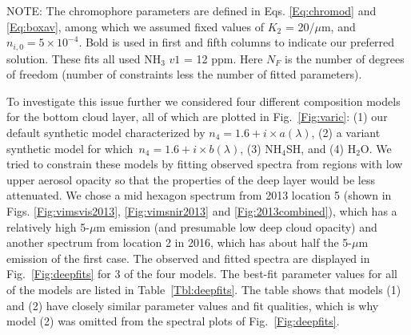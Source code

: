 \documentclass[article,11pt]{emulateapj}
\def\htox{H$_2$O}
\def\mum{$\mu$m }
\def\mumx{$\mu$m}
\def\htox{H$_2$O}
\def\nht{NH$_3$ }
\def\nhfshx{NH$_4$SH}
\begin{document}
\begin{table*}[!htb]
\begin{footnotesize}
\parbox[t]{5.7in}{NOTE: The chromophore parameters are defined in Eqs. \ref{Eq:chromod} and \ref{Eq:boxav}, 
among which we assumed fixed values of $K_2$ = 20/\mumx, and $n_{i,0} = 5\times 10^{-4}$. Bold is used in
first and fifth columns to indicate our preferred solution. These fits all used \nht$v1$ = 12 ppm.
 Here $N_F$ is the number of degrees of freedom (number of
constraints less the number of fitted parameters). }
\end{footnotesize}
\end{table*}

To investigate this issue further we considered four different
composition models for the bottom cloud layer, all of which are
plotted in Fig.\ \ref{Fig:varic}: (1) our default synthetic model
characterized by $n_4 = 1.6 +i\times a(\lambda)$, (2) a variant
synthetic model for which\ $n_4 = 1.6 +i\times b(\lambda)$, (3)
\nhfshx, and (4) \htox.  We tried to constrain these models by fitting
observed spectra from regions with low upper aerosol opacity so that
the properties of the deep layer would be less attenuated.  We chose a
mid hexagon spectrum from 2013 location 5 (shown in Figs. \ref{Fig:vimsvis2013},
 \ref{Fig:vimsnir2013} and \ref{Fig:2013combined}), which has a relatively
high 5-\mum emission (and presumable low deep cloud opacity) and
another spectrum from location 2 in 2016, which has about half the
5-\mum emission of the first case.  The observed and fitted spectra
are displayed in Fig.\ \ref{Fig:deepfits} for 3 of the four models.
The best-fit parameter values for all of the models are listed in
Table\ \ref{Tbl:deepfits}.  The table shows that models (1) and (2)
have closely similar parameter values and fit qualities, which is why
model (2) was omitted from the spectral plots of
Fig.\ \ref{Fig:deepfits}.

\end{document}
